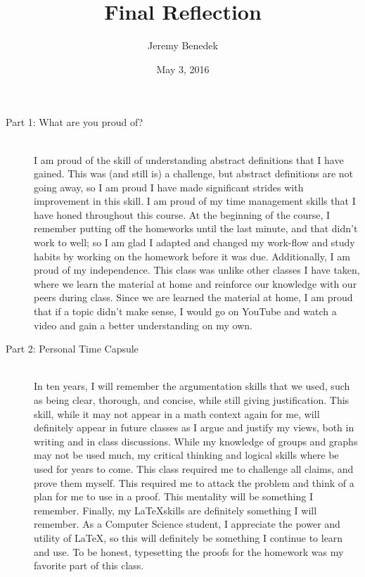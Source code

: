 \documentclass{article}
\title{Final Reflection}
\author{Jeremy Benedek}
\date{May 3, 2016}
\begin{document}
\maketitle

\begin{description}
	\item[Part 1: What are you proud of?] \hfill \\
	  I am proud of the skill of understanding abstract definitions that I have gained. This was (and still is) a challenge, but
	  abstract definitions are not going away, so I am proud I have made significant strides with improvement in this skill. I am proud of
	  my time management skills that I have honed throughout this course. At the beginning of the course, I remember putting off the homeworks
	  until the last minute, and that didn't work to well; so I am glad I adapted and changed my work-flow and study habits by working on the 
	  homework before it was due. Additionally, I am proud of my independence. This class was unlike other classes I have taken, where we learn
	  the material at home and reinforce our knowledge with our peers during class. Since we are learned the material at home, I am proud that if
	  a topic didn't make sense, I would go on YouTube and watch a video and gain a better understanding on my own. 



	\item[Part 2: Personal Time Capsule] \hfil \\

          In ten years, I will remember the argumentation skills that we used, such as being clear, thorough, and concise, while
	  still giving justification. This skill, while it may not appear in a math context again for
	  me, will definitely appear in future classes as I argue and justify my views, both in writing and in class discussions. While my 
	  knowledge of groups and graphs may not be used much, my critical thinking and logical skills where be used for years to come. This
	  class required me to challenge all claims, and prove them myself. This required me to attack the problem and think of a plan for 
	  me to use in a proof. This mentality will be something I remember. Finally, my \LaTeX skills are definitely something I will remember.
	  As a Computer Science student, I appreciate the power and utility of \LaTeX, so this will definitely be something I continue to learn
	  and use. To be honest, typesetting the proofs for the homework was my favorite part of this class. 





\end{description}
\end{document}
